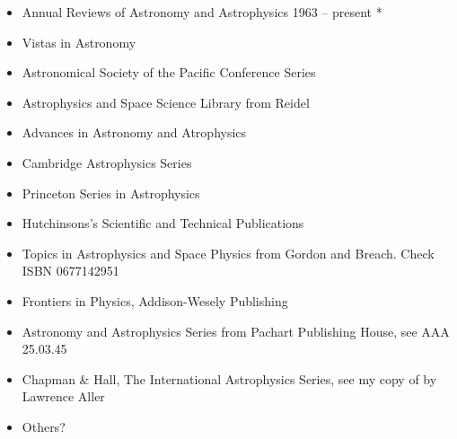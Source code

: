 \begin{itemize}
  \item Annual Reviews of Astronomy and Astrophysics 1963 -- present *
  \item Vistas in Astronomy
  \item Astronomical Society of the Pacific Conference Series
  \item Astrophysics and Space Science Library from Reidel
  \item Advances in Astronomy and Atrophysics
  \item Cambridge Astrophysics Series
  \item Princeton Series in Astrophysics
  \item Hutchinsons's Scientific and Technical Publications
  \item Topics in Astrophysics and Space Physics from Gordon and Breach. Check ISBN 0677142951
  \item Frontiers in Physics, Addison-Wesely Publishing
  \item Astronomy and Astrophysics Series from Pachart Publishing House, see AAA 25.03.45
    \item Chapman \& Hall, The International Astrophysics Series, see my copy of  by Lawrence Aller
  \item Others?
\end{itemize}

